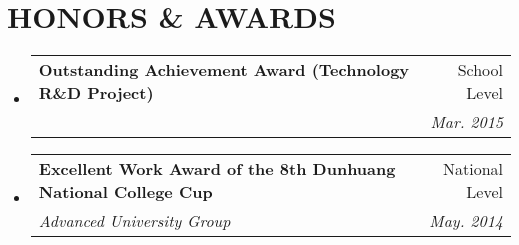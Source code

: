 \documentclass[letterpaper,11pt]{article}
\makeatletter
\newcommand{\resumeSubheading}[4]{
  \vspace{-1pt}\item
    \begin{tabular*}{0.97\textwidth}[t]{l@{\extracolsep{\fill}}r}
      \textbf{#1} & #2 \\
      \textit{\small#3} & \textit{\small #4} \\
    \end{tabular*}\vspace{-5pt}
}
\newcommand{\resumeSubHeadingListStart}{\begin{itemize}[leftmargin=*]}
\newcommand{\resumeSubHeadingListEnd}{\end{itemize}}
\makeatother
\begin{document}
\section{HONORS \& AWARDS}
  \resumeSubHeadingListStart
    \resumeSubheading
      {Outstanding Achievement Award (Technology R\&D Project)}{School Level}
      {}{Mar. 2015}
    \resumeSubheading
      {Excellent Work Award of the 8th Dunhuang National College Cup}{National Level}
      {Advanced University Group}{May. 2014}
  \resumeSubHeadingListEnd

\end{document}

